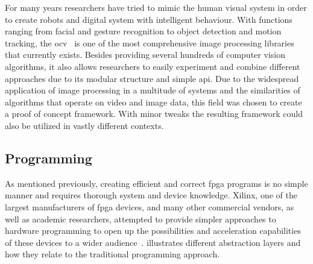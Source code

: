 \documentclass{scrartcl}
\begin{document}
For many years researchers have tried to mimic the human visual system in order
to create robots and digital system with intelligent behaviour. With functions
ranging from facial and gesture recognition to object detection and motion
tracking, the \gls{ocv}~\cite{opencv_library} is one of the most comprehensive
image processing libraries that currently exists. Besides providing several
hundreds of computer vision algorithms, it also allows researchers to easily
experiment and combine different approaches due to its modular structure and
simple \gls{api}. Due to the widespread application of image processing in a
multitude of systems and the similarities of algorithms that operate on video
and image data, this field was chosen to create a proof of concept framework.
With minor tweaks the resulting framework could also be utilized in vastly
different contexts.


\subsection{ Programming}

As mentioned previously, creating efficient and correct \gls{fpga} programs is
no simple manner and requires thorough system and device knowledge. Xilinx, one
of the largest manufacturers of \gls{fpga} devices, and many other commercial
vendors, as well as academic researchers, attempted to provide simpler
approaches to hardware programming to open up the possibilities and acceleration
capabilities of these devices to a wider audience~\cite{winterstein2013high}.
 illustrates different abstraction layers and how they
relate to the traditional programming approach.
\end{document}
